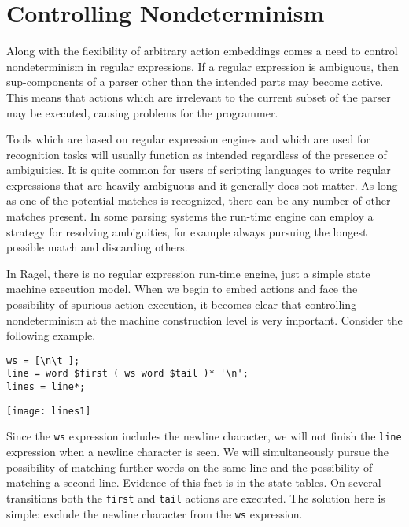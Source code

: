 \documentclass[letterpaper,11pt,oneside]{book}
\newenvironment{inline_code}{\def\baselinestretch{1}\vspace{12pt}\small}{}
\begin{document}
\chapter{Controlling Nondeterminism}
\label{controlling-nondeterminism}

Along with the flexibility of arbitrary action embeddings comes a need to
control nondeterminism in regular expressions. If a regular expression is
ambiguous, then sup-components of a parser other than the intended parts may become
active. This means that actions which are irrelevant to the
current subset of the parser may be executed, causing problems for the
programmer.

Tools which are based on regular expression engines and which are used for
recognition tasks will usually function as intended regardless of the presence
of ambiguities. It is quite common for users of scripting languages to write
regular expressions that are heavily ambiguous and it generally does not
matter. As long as one of the potential matches is recognized, there can be any
number of other matches present.  In some parsing systems the run-time engine
can employ a strategy for resolving ambiguities, for example always pursuing
the longest possible match and discarding others.

In Ragel, there is no regular expression run-time engine, just a simple state
machine execution model. When we begin to embed actions and face the
possibility of spurious action execution, it becomes clear that controlling
nondeterminism at the machine construction level is very important. Consider
the following example.

\begin{inline_code}
\begin{verbatim}
ws = [\n\t ];
line = word $first ( ws word $tail )* '\n';
lines = line*;
\end{verbatim}
\end{inline_code}

\begin{center}
\texttt{[image: lines1]}
\end{center}

Since the \verb|ws| expression includes the newline character, we will
not finish the \verb|line| expression when a newline character is seen. We will
simultaneously pursue the possibility of matching further words on the same
line and the possibility of matching a second line. Evidence of this fact is 
in the state tables. On several transitions both the \verb|first| and
\verb|tail| actions are executed.  The solution here is simple: exclude
the newline character from the \verb|ws| expression. 
\end{document}
